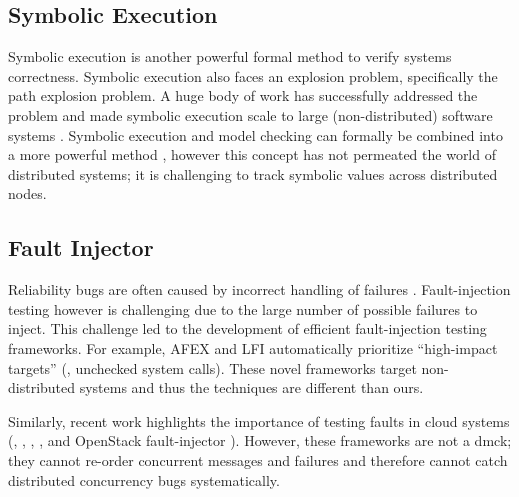\subsection{Symbolic Execution}
Symbolic execution is another powerful formal method to verify systems
correctness.  Symbolic execution also faces an explosion problem, specifically
the path explosion problem.  A huge body of work has successfully addressed the
problem and made symbolic execution scale to large (non-distributed) software
systems \cite{Bucur+11-ParallelSymEx, Cadar+08-KLEE, Chipounov+11-S2e,
Cui+13-RuleDirectedSymExec, Zamfir+10-Synthesis}.  Symbolic execution and model
checking can formally be combined into a more powerful
method \cite{Burch+92-SymbolicMC}, however this concept has not permeated the
world of distributed systems; it is challenging to track symbolic values across
distributed nodes.

\subsection{Fault Injector}
Reliability bugs are often caused by incorrect handling of
failures \cite{Gunawi+11-FateDestini, Gunawi+08-EIO}.  Fault-injection testing
however is challenging due to the large number of possible failures to inject.
This challenge led to the development of efficient fault-injection testing
frameworks.  For example, AFEX \cite{Banabic+12-Blackbox} and
LFI \cite{Marinescu+10-ExtensibleLFI} automatically prioritize ``high-impact
targets'' (\eg, unchecked system calls).  These novel frameworks target
non-distributed systems and thus the techniques are different than ours.

Similarly, recent work highlights the importance of testing faults in cloud
systems (\eg, \fate \cite{Gunawi+11-FateDestini}, \setsudo
\cite{Joshi+13-SetsudoTesting}, \prefail \cite{Joshi+11-PreFail}, and OpenStack
fault-injector \cite{Ju+13-FaultResOpenStack}). However, these frameworks are
not a dmck; they cannot re-order concurrent messages and failures and therefore
cannot catch distributed concurrency bugs systematically.

